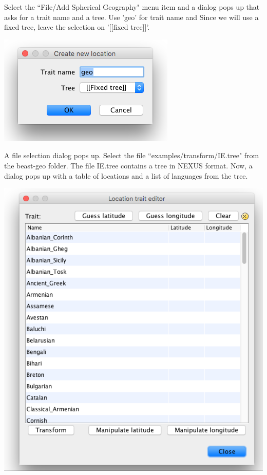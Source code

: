 \documentclass{article}
\begin{document}
Select the ``File/Add Spherical Geography" menu item  and a dialog pops up that asks for a trait name and a tree. Use 'geo' for trait name and Since we will use a fixed tree, leave the selection on '[[fixed tree]]'.

\begin{center}
\includegraphics[scale=0.4]{figures/BEAUti_transform1}
\end{center}

A file selection dialog pops up. Select the file ``examples/transform/IE.tree" from the beast-geo folder. The file IE.tree contains a tree in NEXUS format. Now, a dialog pops up with a table of locations and a list of languages from the tree.

\begin{center}
\includegraphics[scale=0.4]{figures/BEAUti_transform2}
\end{center}
\end{document}
